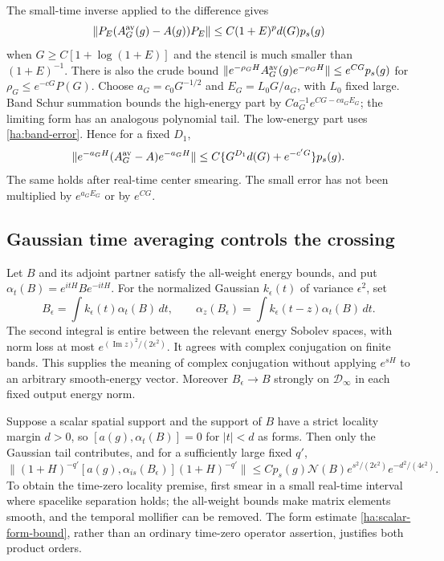 The small-time inverse applied to the difference gives
\begin{equation}
 \|P_E(A_G^{\rm av}(g)-A(g))P_E\|
             \leq C(1+E)^p d(G)p_s(g)
 \label{ha:band-error}
\end{equation}
when $G\geq C[1+\log(1+E)]$ and the stencil is much smaller than
$(1+E)^{-1}$.  There is also the crude bound
$\|e^{-\rho_GH}A_G^{\rm av}(g)e^{-\rho_GH}\|
\leq e^{CG}p_s(g)$ for $\rho_G\leq e^{-cG}P(G)$.
Choose $a_G=c_0G^{-1/2}$ and $E_G=L_0G/a_G$, with $L_0$ fixed large.
Band Schur summation bounds the high-energy part by
$Ca_G^{-1}e^{CG-ca_GE_G}$; the limiting form has an analogous polynomial
tail.  The low-energy part uses \eqref{ha:band-error}.  Hence for a fixed
$D_1$,
\begin{equation}
 \|e^{-a_GH}(A_G^{\rm av}-A)e^{-a_GH}\|
                   \leq C\{G^{D_1}d(G)+e^{-c'G}\}p_s(g).
 \label{ha:shrinking-heat-error}
\end{equation}
The same holds after real-time center smearing.  The small error has
not been multiplied by $e^{a_GE_G}$ or by $e^{CG}$.

\subsection{Gaussian time averaging controls the crossing}

Let $B$ and its adjoint partner satisfy the all-weight energy bounds,
and put $\alpha_t(B)=e^{itH}Be^{-itH}$.  For the normalized Gaussian
$k_\epsilon(t)$ of variance $\epsilon^2$, set
\begin{equation}
 B_\epsilon=\int k_\epsilon(t)\alpha_t(B)\,dt,\qquad
 \alpha_z(B_\epsilon)=\int k_\epsilon(t-z)\alpha_t(B)\,dt.
 \label{ha:gaussian-time}
\end{equation}
The second integral is entire between the relevant energy Sobolev
spaces, with norm loss at most $e^{(\operatorname{Im}z)^2/(2\epsilon^2)}$.
It agrees with complex conjugation on finite bands.  This supplies the
meaning of complex conjugation without applying $e^{sH}$ to an arbitrary
smooth-energy vector.  Moreover $B_\epsilon\to B$ strongly on
$\mathcal D_\infty$ in each fixed output energy norm.

Suppose a scalar spatial support and the support of $B$ have a strict
locality margin $d>0$, so $[a(g),\alpha_t(B)]=0$ for $|t|<d$ as forms.
Then only the Gaussian tail contributes, and for a sufficiently large
fixed $q'$,
\begin{equation}
 \|(1+H)^{-q'}[a(g),\alpha_{is}(B_\epsilon)](1+H)^{-q'}\|
 \leq Cp_s(g)\mathcal N(B)
          e^{s^2/(2\epsilon^2)}e^{-d^2/(4\epsilon^2)}.
 \label{ha:gaussian-tail}
\end{equation}
To obtain the time-zero locality premise, first smear in a small real-time
interval where spacelike separation holds; the all-weight bounds make
matrix elements smooth, and the temporal mollifier can be removed.
The form estimate \eqref{ha:scalar-form-bound}, rather than an ordinary
time-zero operator assertion, justifies both product orders.

